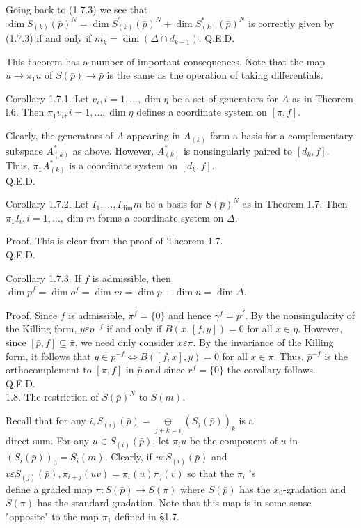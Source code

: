 \documentclass[10pt]{article}
\begin{document}
Going back to (1.7.3) we see that $\operatorname{dim} S_{(k)}(\bar{p})^{N}= \operatorname{dim} S_{(k)}^{\prime}(\bar{p})^{N}+\operatorname{dim} S_{(k)}^{*}(\bar{p})^{N}$ is correctly given by (1.7.3) if and only if $m_{k}=\operatorname{dim}\left(\Delta \cap d_{k-1}\right)$. Q.E.D.

This theorem has a number of important consequences. Note that the map $u \rightarrow \pi_{1} u$ of $S(\bar{p}) \rightarrow \bar{p}$ is the same as the operation of taking differentials.

Corollary 1.7.1. Let $v_{i}, i=1, \ldots, \operatorname{dim} \eta$ be a set of generators for $A$ as in Theorem l.6. Then $\pi_{1} v_{i}, i=1, \ldots, \operatorname{dim} \eta$ defines a coordinate system on $[\pi, f]$.

Clearly, the generators of $A$ appearing in $A_{(k)}$ form a basis for a complementary subspace $A_{(k)}^{*}$ as above. However, $A_{(k)}^{*}$ is nonsingularly paired to $\left[d_{k}, f\right]$. Thus, $\pi_{1} A_{(k)}^{*}$ is a coordinate system on $\left[d_{k}, f\right]$.\\
Q.E.D.

Corollary 1.7.2. Let $I_{1}, \ldots, I_{\operatorname{dim}} m$ be a basis for $S(\bar{p})^{N}$ as in Theorem 1.7. Then $\pi_{1} I_{i}, i=1, \ldots, \operatorname{dim} m$ forms a coordinate system on $\Delta$.

Proof. This is clear from the proof of Theorem 1.7.\\
Q.E.D.

Corollary 1.7.3. If $f$ is admissible, then $\operatorname{dim} \bar{p}^{f}=\operatorname{dim} o^{f}=\operatorname{dim} m=\operatorname{dim} p-\operatorname{dim} n=\operatorname{dim} \Delta$.

Proof. Since $f$ is admissible, $\pi^{f}=\{0\}$ and hence $\gamma^{f}=\bar{p}^{f}$. By the nonsingularity of the Killing form, $y \varepsilon p^{-f}$ if and only if $B(x,[f, y])=0$ for all $x \in \eta$. However, since $[\bar{p}, f] \subseteq \bar{\pi}$, we need only consider $x \varepsilon \pi$. By the invariance of the Killing form, it follows that $y \in p^{-f} \Leftrightarrow B([f, x], y)=0$ for all $x \in \pi$. Thus, $\bar{p}^{-f}$ is the orthocomplement to $[\pi, f]$ in $\bar{p}$ and since $r^{f}=\{0\}$ the corollary follows.\\
Q.E.D.\\
1.8. The restriction of $S(\bar{p})^{N}$ to $S(m)$.

Recall that for any $i, S_{(i)}(\bar{p})=\underset{j+k=i}{\oplus}\left(S_{j}(\bar{p})\right)_{k}$ is a\\
direct sum. For any $u \in S_{(i)}(\bar{p})$, let $\pi_{i} u$ be the component of $u$ in $\left(S_{i}(\bar{p})\right)_{0}=S_{i}(m)$. Clearly, if $u \varepsilon S_{(i)}(\bar{p})$ and $v \varepsilon S_{(j)}(\bar{p}), \pi_{i+j}(u v)=\pi_{i}(u) \pi_{j}(v)$ so that the $\pi_{i}$ 's\\
define a graded map $\pi: S(\bar{p}) \rightarrow S(\pi)$ where $S(\bar{p})$ has the $x_{0}$-gradation and $S(\pi)$ has the standard gradation. Note that this map is in some sense "opposite" to the map $\pi_{1}$ defined in §1.7.
\end{document}
